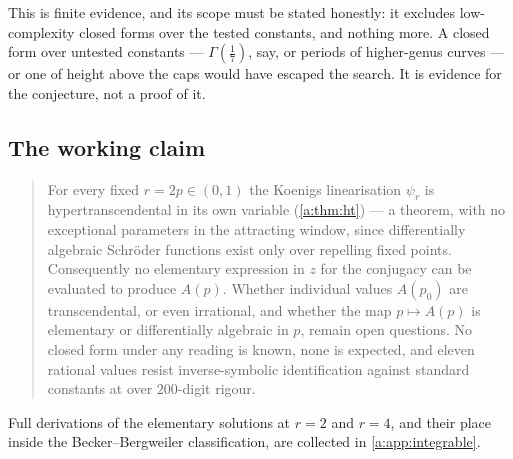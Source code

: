 This is finite evidence, and its scope must be stated honestly: it excludes
low-complexity closed forms over the tested constants, and nothing more. A closed
form over untested constants --- $\Gamma(\tfrac17)$, say, or periods of
higher-genus curves --- or one of height above the caps would have escaped the
search. It is evidence for the conjecture, not a proof of it.

\subsection{The working claim}
\label{a:sec:workingclaim}

\begin{quote}
For every fixed $r=2p\in(0,1)$ the Koenigs linearisation $\psi_r$ is
hypertranscendental in its own variable (\cref{a:thm:ht}) --- a theorem, with no
exceptional parameters in the attracting window, since differentially algebraic
Schröder functions exist only over repelling fixed points. Consequently no
elementary expression in $z$ for the conjugacy can be evaluated to produce $A(p)$.
Whether individual values $A(p_0)$ are transcendental, or even irrational, and
whether the map $p\mapsto A(p)$ is elementary or differentially algebraic in $p$,
remain open questions. No closed form under any reading is known, none is expected,
and eleven rational values resist inverse-symbolic identification against standard
constants at over $200$-digit rigour.
\end{quote}

Full derivations of the elementary solutions at $r=2$ and $r=4$, and their place
inside the Becker--Bergweiler classification, are collected in
\cref{a:app:integrable}.
